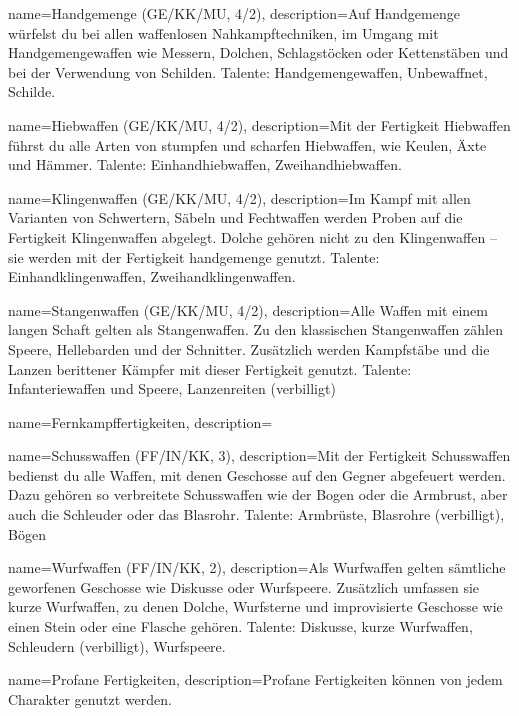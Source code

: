 {
    name={Handgemenge (GE/KK/MU, 4/2)},
    description={Auf Handgemenge würfelst du bei allen waffenlosen Nahkampftechniken, im Umgang mit Handgemengewaffen wie Messern, Dolchen, Schlagstöcken oder Kettenstäben und bei der Verwendung von Schilden. Talente: Handgemengewaffen, Unbewaffnet, Schilde.}}

{
    name={Hiebwaffen (GE/KK/MU, 4/2)},
    description={Mit der Fertigkeit Hiebwaffen führst du alle Arten von stumpfen und scharfen Hiebwaffen, wie Keulen, Äxte und Hämmer. Talente: Einhandhiebwaffen, Zweihandhiebwaffen.}}

{
    name={Klingenwaffen (GE/KK/MU, 4/2)},
    description={Im Kampf mit allen Varianten von Schwertern, Säbeln und Fechtwaffen werden Proben auf die Fertigkeit Klingenwaffen abgelegt. Dolche gehören nicht zu den Klingenwaffen – sie werden mit der Fertigkeit \gls{handgemenge} genutzt. Talente: Einhandklingenwaffen, Zweihandklingenwaffen.}}

{
    name={Stangenwaffen (GE/KK/MU, 4/2)},
    description={Alle Waffen mit einem langen Schaft gelten als Stangenwaffen. Zu den klassischen Stangenwaffen zählen Speere, Hellebarden und der Schnitter. Zusätzlich werden Kampfstäbe und die Lanzen berittener Kämpfer mit dieser Fertigkeit genutzt. Talente: Infanteriewaffen und Speere, Lanzenreiten (\gls{verbilligt})}}

{
    name={Fernkampffertigkeiten},
    description={}}

{
    name={Schusswaffen (FF/IN/KK, 3)},
    description={Mit der Fertigkeit Schusswaffen bedienst du alle Waffen, mit denen Geschosse auf den Gegner abgefeuert werden. Dazu gehören so verbreitete Schusswaffen wie der Bogen oder die Armbrust, aber auch die Schleuder oder das Blasrohr. Talente: Armbrüste, Blasrohre (verbilligt), Bögen}}

{
    name={Wurfwaffen (FF/IN/KK, 2)},
    description={Als Wurfwaffen gelten sämtliche geworfenen Geschosse wie Diskusse oder Wurfspeere. Zusätzlich umfassen sie kurze Wurfwaffen, zu denen Dolche, Wurfsterne und improvisierte Geschosse wie einen Stein oder eine Flasche gehören. Talente: Diskusse, kurze Wurfwaffen, Schleudern (\gls{verbilligt}), Wurfspeere.}}

{
    name={Profane Fertigkeiten},
    description={Profane Fertigkeiten können von jedem Charakter genutzt werden.}}

